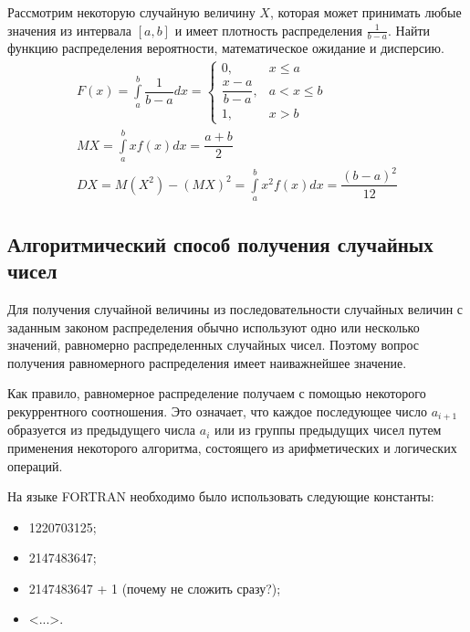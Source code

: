 Рассмотрим некоторую случайную величину $X$, которая может принимать любые значения из интервала $[a, b]$ и имеет плотность распределения $\frac{1}{b - a}$. Найти функцию распределения вероятности, математическое ожидание и дисперсию.
%
\begin{gather*}
    F(x) = \int\limits_{a}^b\dfrac{1}{b - a}dx = \begin{cases}
        0,                    & x \leqslant a     \\
        \dfrac{x - a}{b - a}, & a < x \leqslant b \\
        1,                    & x > b
    \end{cases}\\
    MX = \int\limits_{a}^{b}xf(x)dx = \dfrac{a + b}{2}\\
    DX = M(X^2) - (MX)^2 = \int\limits_{a}^{b}x^2f(x)dx = \dfrac{(b - a)^2}{12}
\end{gather*}
%
\subsection{Алгоритмический способ получения случайных чисел}

Для получения случайной величины из последовательности случайных величин с заданным законом распределения обычно используют одно или несколько значений, равномерно распределенных случайных чисел. Поэтому вопрос получения равномерного распределения имеет наиважнейшее значение.

Как правило, равномерное распределение получаем с помощью некоторого рекуррентного соотношения. Это означает, что каждое последующее число $a_{i + 1}$ образуется из предыдущего числа $a_i$ или из группы предыдущих чисел путем применения некоторого алгоритма, состоящего из арифметических и логических операций.

На языке FORTRAN необходимо было использовать следующие константы:

\begin{itemize}
    \item 1220703125;
    \item 2147483647;
    \item 2147483647 + 1 (почему не сложить сразу?);
    \item <...>.
\end{itemize}


